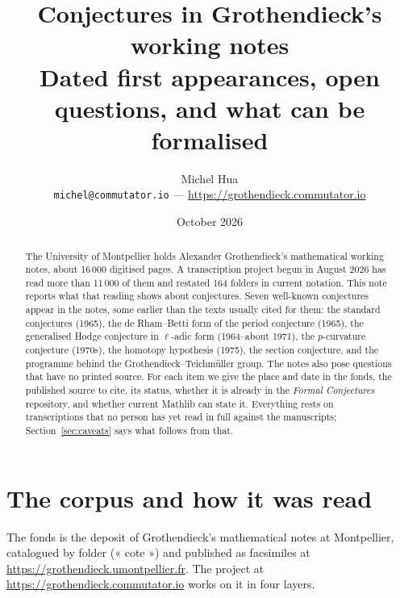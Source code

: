 \documentclass[11pt,a4paper]{article}
\title{Conjectures in Grothendieck's working notes\\[4pt]
\large Dated first appearances, open questions, and what can be formalised}
\author{Michel Hua\\\small\texttt{michel@commutator.io} --- \url{https://grothendieck.commutator.io}}
\date{October 2026}
\begin{document}
\maketitle

\begin{abstract}
\noindent The University of Montpellier holds Alexander Grothendieck's
mathematical working notes, about 16\,000 digitised pages. A transcription
project begun in August 2026 has read more than 11\,000 of them and restated
164 folders in current notation. This note reports what that reading shows
about conjectures. Seven well-known conjectures appear in the notes, some
earlier than the texts usually cited for them: the standard conjectures
(1965), the de Rham--Betti form of the period conjecture (1965), the
generalised Hodge conjecture in $\ell$-adic form (1964--about 1971), the
$p$-curvature conjecture (1970s), the homotopy hypothesis (1975), the section
conjecture, and the programme behind the Grothendieck--Teichmüller group. The notes also pose questions that have no
printed source. For each item we give the place and date in the fonds, the
published source to cite, its status, whether it is already in the
\emph{Formal Conjectures} repository, and whether current Mathlib can state
it. Everything rests on transcriptions that no person has yet read in full
against the manuscripts; Section~\ref{sec:caveats} says what follows from that.
\end{abstract}

\section{The corpus and how it was read}

The fonds is the deposit of Grothendieck's mathematical notes at Montpellier,
catalogued by folder (« cote ») and published as facsimiles at
\url{https://grothendieck.umontpellier.fr}. The project at
\url{https://grothendieck.commutator.io} works on it in four layers.
\end{document}
